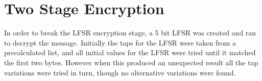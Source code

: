 \section{Two Stage Encryption}

In order to break the LFSR encryption stage, a 5 bit LFSR was created and ran to decrypt the message.
Initially the taps for the LFSR were taken from a precalculated list, and all initial values for the LFSR were tried until it matched the first two bytes.
However when this produced an unexpected result all the tap variations were tried in turn, though no alternative variations were found.
